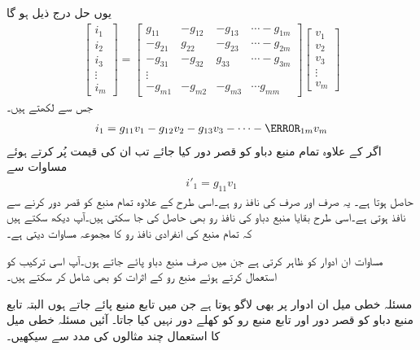 یوں حل درج ذیل ہو گا
\begin{align*}
\begin{bmatrix}
i_1\\
i_2\\
i_3\\
\vdots\\
i_m
\end{bmatrix}
=
\begin{bmatrix}
g_{11} & -g_{12}& -g_{13}& \cdots -g_{1m}\\
-g_{21} & g_{22}& -g_{23}& \cdots -g_{2m}\\
-g_{31} & -g_{32}& g_{33}& \cdots -g_{3m}\\
\vdots\\
-g_{m1}&-g_{m2}&-g_{m3}&\cdots g_{mm}
\end{bmatrix}
\begin{bmatrix}
v_{1}\\
v_{2}\\
v_{3}\\
\vdots\\
v_{m}
\end{bmatrix}
\end{align*}
جس سے  لکھتے ہیں۔
\begin{align}\label{مساوات_مسئلہ_عمومی_رو_حل}
i_1=g_{11} v_1-g_{12}v_2-g_{13}v_3 -\cdots -\g_{1m}v_m
\end{align}
اگر  کے علاوہ تمام منبع دباو کو قصر دور کیا جائے تب ان کی قیمت  پُر کرتے ہوئے مساوات  سے 
\begin{align*}
i'_1=g_{11} v_1
\end{align*}
حاصل ہوتا ہے۔ یہ صرف اور صرف  کی نافذ رو ہے۔اسی طرح  کے علاوہ تمام منبع کو قصر دور کرنے سے   نافذ ہوتی ہے۔اسی طرح بقایا منبع دباو کی نافذ  رو بھی حاصل کی جا سکتی ہیں۔آپ دیکھ سکتے ہیں کہ تمام  منبع کی انفرادی نافذ رو کا مجموعہ مساوات  دیتی ہے۔

مساوات  ان ادوار کو ظاہر کرتی ہے جن میں صرف منبع دباو پائے جاتے ہوں۔آپ اسی ترکیب کو استعمال کرتے ہوئے منبع رو کے اثرات کو بھی شامل کر سکتے ہیں۔

مسئلہ خطی میل  ان ادوار پر بھی لاگو ہوتا  ہے جن میں تابع منبع  پائے جاتے ہوں البتہ تابع منبع دباو کو قصر دور اور تابع منبع رو کو کھلے دور نہیں کیا جاتا۔ آئیں مسئلہ خطی میل کا استعمال چند مثالوں کی مدد سے سیکھیں۔

